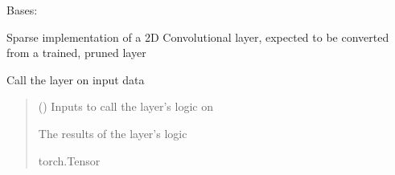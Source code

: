 \documentclass[letterpaper,10pt,english]{sphinxmanual}
\begin{document}
\begin{fulllineitems}
\label{\detokenize{beyondml.pt.layers:beyondml.pt.layers.SparseConv2D.SparseConv2D}}
\pysigstartsignatures
{}
\pysigstopsignatures
\sphinxAtStartPar
Bases: 

\sphinxAtStartPar
Sparse implementation of a 2D Convolutional layer, expected to be converted from a
trained, pruned layer

\begin{fulllineitems}
\label{\detokenize{beyondml.pt.layers:beyondml.pt.layers.SparseConv2D.SparseConv2D.forward}}
\pysigstartsignatures
{}
\pysigstopsignatures
\sphinxAtStartPar
Call the layer on input data
\begin{quote}\begin{description}
\sphinxAtStartPar
{} () \textendash{} Inputs to call the layer’s logic on

\sphinxAtStartPar
{} \textendash{} The results of the layer’s logic

\sphinxAtStartPar
torch.Tensor

\end{description}\end{quote}

\end{fulllineitems}


\end{fulllineitems}
\end{document}
